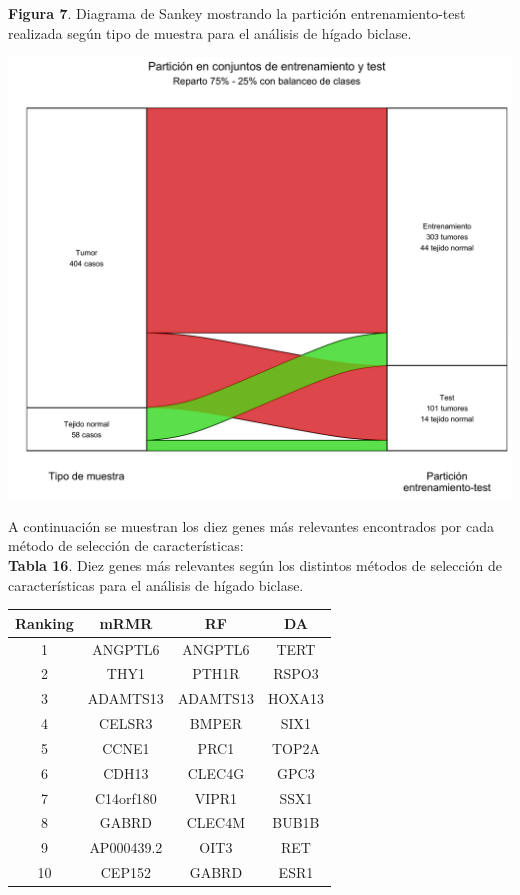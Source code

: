 \textbf{Figura 7}. Diagrama de Sankey mostrando la partición entrenamiento-test realizada según tipo de muestra para el análisis de hígado biclase.
\begin{center}
	\includegraphics[width=1\textwidth]{figuras/07_higado_biclase_sankey.png}
\end{center}

A continuación se muestran los diez genes más relevantes encontrados por cada método de selección de características:\\

\textbf{Tabla 16}. Diez genes más relevantes según los distintos métodos de selección de características para el análisis de hígado biclase.

\begin{table}[H]
	\centering
	\begin{tabular}{cccc}
		\hline
		\textbf{Ranking} & \textbf{mRMR} & \textbf{RF} & \textbf{DA} \\ \hline
		1                & ANGPTL6       & ANGPTL6     & TERT        \\
		2                & THY1          & PTH1R       & RSPO3       \\
		3                & ADAMTS13      & ADAMTS13    & HOXA13      \\
		4                & CELSR3        & BMPER       & SIX1        \\
		5                & CCNE1         & PRC1        & TOP2A       \\
		6                & CDH13         & CLEC4G      & GPC3        \\
		7                & C14orf180     & VIPR1       & SSX1        \\
		8                & GABRD         & CLEC4M      & BUB1B       \\
		9                & AP000439.2    & OIT3        & RET         \\
		10               & CEP152        & GABRD       & ESR1        \\ \hline
	\end{tabular}
\end{table}

